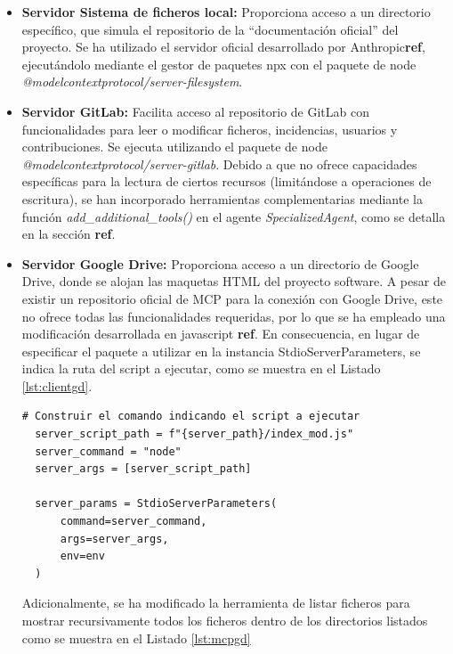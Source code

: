 \begin{itemize}
\item\textbf{Servidor Sistema de ficheros local: }Proporciona acceso a un directorio específico, que simula el repositorio de la ``documentación oficial'' del proyecto. Se ha utilizado el servidor oficial desarrollado por Anthropic\textbf{ref}, ejecutándolo mediante el gestor de paquetes npx con el paquete de node \textit{@modelcontextprotocol/server-filesystem}.

\item\textbf{Servidor GitLab: }Facilita acceso al repositorio de GitLab con funcionalidades para leer o modificar ficheros, incidencias, usuarios y contribuciones. Se ejecuta utilizando el paquete de node \textit{@modelcontextprotocol/server-gitlab}. Debido a que no ofrece capacidades específicas para la lectura de ciertos recursos (limitándose a operaciones de escritura), se han incorporado herramientas complementarias mediante la función \textit{add\_additional\_tools()} en el agente \textit{SpecializedAgent}, como se detalla en la sección \textbf{ref}. 

\item\textbf{Servidor Google Drive: }Proporciona acceso a un directorio de Google Drive, donde se alojan las maquetas HTML del proyecto software. A pesar de existir un repositorio oficial de MCP para la conexión con Google Drive, este no ofrece todas las funcionalidades requeridas, por lo que se ha empleado una modificación desarrollada en javascript \textbf{ref}. En consecuencia, en lugar de especificar el paquete a utilizar en la instancia StdioServerParameters, se indica la ruta del script a ejecutar, como se muestra en el Listado \ref{lst:clientgd}.

\begin{lstlisting}[caption={mcp\_multi\_client.py: StdioServerParameters para el servidor MCP de Google Drive},label={lst:clientgd}]
  # Construir el comando indicando el script a ejecutar
  server_script_path = f"{server_path}/index_mod.js"
  server_command = "node"
  server_args = [server_script_path]

  server_params = StdioServerParameters(
      command=server_command,
      args=server_args,
      env=env
  )
\end{lstlisting}


Adicionalmente, se ha modificado la herramienta de listar ficheros para mostrar recursivamente todos los ficheros dentro de los directorios listados como se muestra en el Listado \ref{lst:mcpgd}



\end{itemize}

